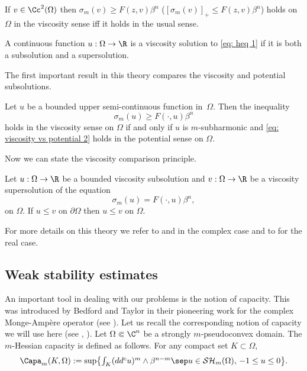 \begin{remark} If $v \in \Cc^2 (\Omega)$ then $\sigma_m(v)\geq F(z,v)\beta^n$ (\resp $[\sigma_m(v)]_+\leq F(z,v)\beta^n$) holds on $\Omega$ in the viscosity sense iff it holds in the usual sense.
\end{remark}

\begin{definition}
A continuous function $u: \Omega \to \R$ is a viscosity solution to \eqref{eq: heq 1} if it is both a subsolution and a supersolution.
\end{definition}

The first important result in this theory compares the viscosity and potential subsolutions.

\begin{proposition}[\cite{Lu13}] \label{prop: viscosity vs potential general case}
Let $u$ be a bounded upper semi-continuous function in~$\Omega$. Then the inequality
\begin{equation}\label{eq: viscosity vs potential 2}
\sigma_m (u)\geq F(\cdot,u)\beta^n
\end{equation}
holds in the viscosity sense on $\Omega$ if and only if $u$ is $m$-subharmonic and \eqref{eq: viscosity vs potential 2} holds in the potential sense on $\Omega$.
\end{proposition}

Now we can state the viscosity comparison principle.

\begin{theorem} [\cite{Lu13}]\label{thm: viscosity comparison principle}
Let $u: \Omega \to \R$ be a bounded viscosity subsolution and $v: \Omega \to \R$ be a viscosity supersolution of the equation
\[
\sigma_m(u)=F(\cdot,u)\beta^n,
\]
on $\Omega$. If $u \leq v$ on $\partial \Omega$ then $u\leq v$ on $\Omega$.
\end{theorem}

For more details on this theory we refer to \cite{Lu13} and \cite{EGZ11} in the complex case and to \cite{CIL92} for the real case.

\subsection{Weak stability estimates}

An important tool in dealing with our problems is the notion of capacity. This was introduced by Bedford and Taylor in their pioneering work for the complex Monge-Ampère operator (see \cite{BT82}).
Let us recall the corresponding notion of capacity we will use here (see \cite{Lu12}, \cite{SA13}). Let $\Omega \Subset \C^n$ be a strongly $m$-pseudoconvex domain. The $m$-Hessian capacity is defined as follows. For any compact set $K \subset \Omega$,
\[
\Capa_m(K,\Omega):= \sup \bigl\{\textstyle\int_K (dd^c u)^m \wedge \beta^{n - m} \sep u \in \mathcal{SH}_m (\Omega),\, - 1 \leq u \leq 0\bigr\}.
\]

